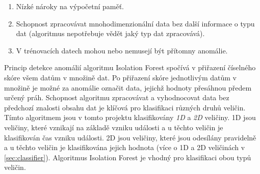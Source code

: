 \begin{enumerate}
  \item Nízké nároky na výpočetní paměť.
  \item Schopnost zpracovávat mnohodimenzionální data bez další informace o typu dat (algoritmus nepotřebuje vědět jaký typ dat zpracovává).
  \item V trénovacích datech mohou nebo nemusejí být přítomny anomálie.
\end{enumerate}

Princip detekce anomálií algoritmu Isolation Forest spočívá v přiřazení číselného skóre všem datům v množině dat. Po přiřazení skóre jednotlivým datům v množině je možné za anomálie označit data, jejichž hodnoty přesáhnou předem určený práh. Schopnost algoritmu zpracovávat a vyhodnocovat data bez předchozí znalosti obsahu dat je klíčová pro klasifikaci různých druhů veličin. Tímto algoritmem jsou v tomto projektu klasifikovány \textit{1D} a \textit{2D} veličiny. 1D jsou veličiny, které vznikají na základě vzniku události a u těchto veličin je klasifikován čas vzniku události. 2D jsou veličiny, které jsou odesílány pravidelně a u těchto veličin je klasifikována jejich hodnota (více o 1D a 2D veličinách v \cref{sec:classifier}). Algoritmus Isolation Forest je vhodný pro klasifikaci obou typů veličin. 